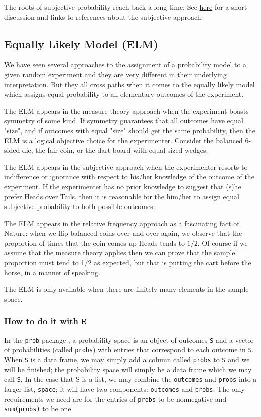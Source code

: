 The roots of subjective probability reach back a long time. See \href{http://en.wikipedia.org/wiki/Subjective_probability}{here}
for a short discussion and links to references about the subjective
approach.

\subsection{Equally Likely Model (ELM)}
\label{sec-4-3-4}

We have seen several approaches to the assignment of a probability
model to a given random experiment and they are very different in
their underlying interpretation. But they all cross paths when it
comes to the equally likely model which assigns equal probability to
all elementary outcomes of the experiment.

The ELM appears in the measure theory approach when the experiment
boasts symmetry of some kind. If symmetry guarantees that all outcomes
have equal "size", and if outcomes with equal "size" should get
the same probability, then the ELM is a logical objective choice for
the experimenter. Consider the balanced 6-sided die, the fair coin, or
the dart board with equal-sized wedges.

The ELM appears in the subjective approach when the experimenter
resorts to indifference or ignorance with respect to his/her knowledge
of the outcome of the experiment. If the experimenter has no prior
knowledge to suggest that (s)he prefer Heads over Tails, then it is
reasonable for the him/her to assign equal subjective probability to
both possible outcomes.

The ELM appears in the relative frequency approach as a fascinating
fact of Nature: when we flip balanced coins over and over again, we
observe that the proportion of times that the coin comes up Heads
tends to \(1/2\). Of course if we assume that the measure theory
applies then we can prove that the sample proportion must tend to 1/2
as expected, but that is putting the cart before the horse, in a
manner of speaking.

The ELM is only available when there are finitely many elements in the
sample space.

\subsubsection{How to do it with \(\mathsf{R}\)}
\label{sec-4-3-4-1}

In the \texttt{prob} package \cite{prob}, a probability space is an object of
outcomes \texttt{S} and a vector of probabilities (called \texttt{probs}) with
entries that correspond to each outcome in \texttt{S}. When \texttt{S} is a data
frame, we may simply add a column called \texttt{probs} to \texttt{S} and we will be
finished; the probability space will simply be a data frame which we
may call \texttt{S}. In the case that S is a list, we may combine the
\texttt{outcomes} and \texttt{probs} into a larger list, \texttt{space}; it will have two
components: \texttt{outcomes} and \texttt{probs}. The only requirements we need are
for the entries of \texttt{probs} to be nonnegative and \texttt{sum(probs)} to be
one.

